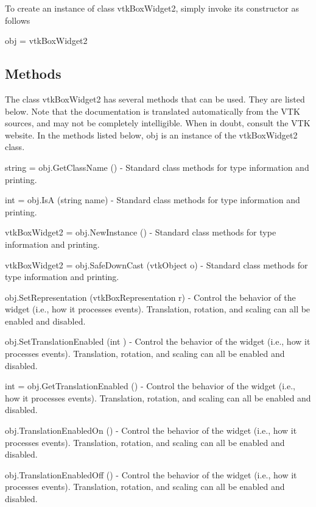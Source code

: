 To create an instance of class vtk\-Box\-Widget2, simply invoke its constructor as follows \begin{DoxyVerb}  obj = vtkBoxWidget2
\end{DoxyVerb}
 \hypertarget{vtkwidgets_vtkxyplotwidget_Methods}{}\subsection{Methods}\label{vtkwidgets_vtkxyplotwidget_Methods}
The class vtk\-Box\-Widget2 has several methods that can be used. They are listed below. Note that the documentation is translated automatically from the V\-T\-K sources, and may not be completely intelligible. When in doubt, consult the V\-T\-K website. In the methods listed below, {\ttfamily obj} is an instance of the vtk\-Box\-Widget2 class. 
\begin{DoxyItemize}
\item {\ttfamily string = obj.\-Get\-Class\-Name ()} -\/ Standard class methods for type information and printing.  
\item {\ttfamily int = obj.\-Is\-A (string name)} -\/ Standard class methods for type information and printing.  
\item {\ttfamily vtk\-Box\-Widget2 = obj.\-New\-Instance ()} -\/ Standard class methods for type information and printing.  
\item {\ttfamily vtk\-Box\-Widget2 = obj.\-Safe\-Down\-Cast (vtk\-Object o)} -\/ Standard class methods for type information and printing.  
\item {\ttfamily obj.\-Set\-Representation (vtk\-Box\-Representation r)} -\/ Control the behavior of the widget (i.\-e., how it processes events). Translation, rotation, and scaling can all be enabled and disabled.  
\item {\ttfamily obj.\-Set\-Translation\-Enabled (int )} -\/ Control the behavior of the widget (i.\-e., how it processes events). Translation, rotation, and scaling can all be enabled and disabled.  
\item {\ttfamily int = obj.\-Get\-Translation\-Enabled ()} -\/ Control the behavior of the widget (i.\-e., how it processes events). Translation, rotation, and scaling can all be enabled and disabled.  
\item {\ttfamily obj.\-Translation\-Enabled\-On ()} -\/ Control the behavior of the widget (i.\-e., how it processes events). Translation, rotation, and scaling can all be enabled and disabled.  
\item {\ttfamily obj.\-Translation\-Enabled\-Off ()} -\/ Control the behavior of the widget (i.\-e., how it processes events). Translation, rotation, and scaling can all be enabled and disabled.  

\end{DoxyItemize}
